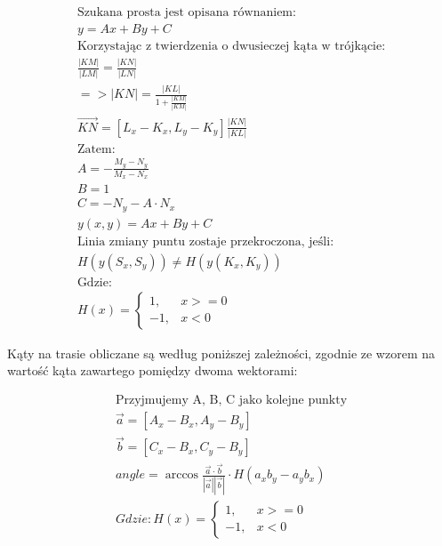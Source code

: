 \documentclass[12pt, a4paper]{article}
\begin{document}
\begin{gather*}
	\text{Szukana prosta jest opisana równaniem:} \\ 
	y = Ax + By + C \\ 
	\text{Korzystając z twierdzenia o dwusieczej kąta w trójkącie:} \\	
	\frac{|KM|}{|LM|} = \frac{|KN|}{|LN|} \\
	=>|KN| = \frac{|KL|}{1+\frac{|KM|}{|KM|}} \\
	\vec{KN} = [L_x - K_x, L_y - K_y] \frac{|KN|}{|KL|} \\
	\text{Zatem:} \\
	A = -\frac{M_y - N_y}{M_x - N_x} \\
	B = 1 \\
	C = -N_y - A \cdot N_x \\
	y(x, y) = Ax + By + C  \\
	\text{Linia zmiany puntu zostaje przekroczona, jeśli:} \\
	H(y(S_x, S_y)) \neq  H(y(K_x, K_y)) \\
	\text{Gdzie:} \\
	H(x) = \begin{cases} 1, & x >= 0 \\ -1, & x < 0 \end{cases}	 
\end{gather*}

Kąty na trasie obliczane są według poniższej zależności, zgodnie ze wzorem na wartość kąta zawartego pomiędzy dwoma wektorami:

\begin{gather*} 
	\text{Przyjmujemy A, B, C jako kolejne punkty} \\ 
 	\vec{a} = [A_x - B_x, A_y - B_y] \\
 	\vec{b} = [C_x - B_x, C_y - B_y] \\
 	angle = 	\arccos{\frac{\vec{a} \cdot \vec{b}}{|\vec{a}||\vec{b}|} } \cdot H(a_x b_y -  a_y b_x) \\ 
 	Gdzie:
 	H(x) = \begin{cases} 1, & x >= 0 \\ -1, & x < 0 \end{cases}\\
\end{gather*}
\end{document}

